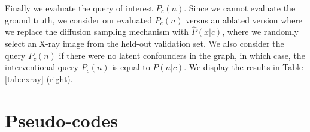 \documentclass{article}
\theoremstyle{plain}
\theoremstyle{definition}
\theoremstyle{remark}
\begin{document}
	Finally we evaluate the query of interest $P_c(n)$. Since we cannot evaluate the ground truth, we consider our evaluated $P_c(n)$ versus an ablated version where we replace the diffusion sampling mechanism with $\hat P(x|c)$, where we randomly select an X-ray image from the held-out validation set. We also consider the query $P_c(n)$ if there were no latent confounders in the graph, in which case, the interventional query $P_c(n)$ is equal to $P(n|c)$. We display the results in Table \ref{tab:cxray} (right).
	
	






	



\section{Pseudo-codes}
\label{sec:pseudo-code}
\end{document}
